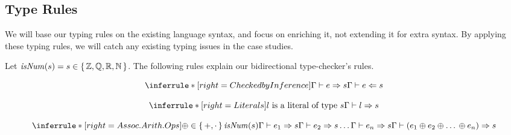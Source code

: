 \subsection{Type Rules}
\label{chap:typed-expr:sec:typing-the-expression-language:subsec:type-rules}
\newcommand{\isNum}[1]{\mathit{isNum}(#1)}

We will base our typing rules on the existing \Expr{} language syntax, and focus
on enriching it, not extending it for extra syntax. By applying these typing
rules, we will catch any existing typing issues in the case studies. 

Let \(\isNum{s} = s \in \set{\bb{Z}, \bb{Q}, \bb{R}, \bb{N}}\). The following
rules explain our bidirectional type-checker's rules.

\newcommand{\newTypeRule}[4]{%
\begin{equation}%
      \inferrule*[right=#1]{#3}{#4}%
      \label{eq:tr:#2}%
\end{equation}%
}



\newTypeRule{Checked by Inference}{check}
      {\Gamma \vdash e \Rightarrow s}
      {\Gamma \vdash e \Leftarrow s}


\newTypeRule{Literals}{literals}
      {l~\text{is a literal of type}~s}
      {\Gamma \vdash l \Rightarrow s}


\newTypeRule{Assoc. Arith. Ops}{assocA}
      {\oplus \in \set{+, \cdot{}} \\ \isNum{s} \\\\%
       \Gamma \vdash e_1 \Rightarrow s \\ \Gamma \vdash e_2 \Rightarrow s \\ \ldots{} \\ \Gamma \vdash e_n \Rightarrow s}
      {\Gamma \vdash (e_1 \oplus e_2 \oplus \ldots{} \oplus e_n) \Rightarrow s}


